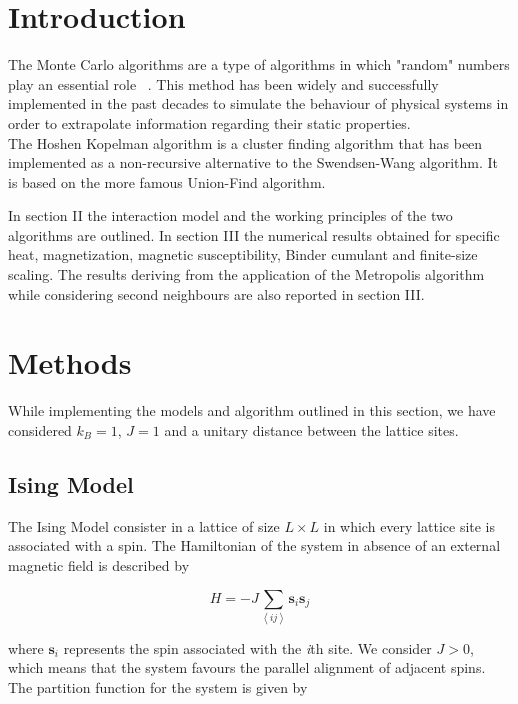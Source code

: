 \documentclass[twoside]{article}
\def\mean#1{\left< #1 \right>}
\begin{document}
\begin{multicols}{2} %

\section{Introduction}
The Monte Carlo algorithms are a type of algorithms in which "random" numbers play an essential role ~\cite{thijssen}. This method has been widely and successfully implemented in the past decades to simulate the behaviour of physical systems in order to extrapolate information regarding their static properties. \\
The Hoshen Kopelman algorithm is a cluster finding algorithm that has been implemented as a non-recursive alternative to the Swendsen-Wang algorithm. It is based on the more famous Union-Find algorithm.

In section II the interaction model and the working principles of the two algorithms are outlined. In section III the numerical results obtained for specific heat, magnetization, magnetic susceptibility, Binder cumulant and finite-size scaling. The results deriving from the application of the Metropolis algorithm while considering second neighbours are also reported in section III.


\section{Methods}
While implementing the models and algorithm outlined in this section, we have considered $k_B = 1$, $J = 1$ and a unitary distance between the lattice sites.

\subsection{Ising Model}
The Ising Model consister in a lattice of size $L \times L$ in which every lattice site is associated with a spin. The Hamiltonian of the system in absence of an external magnetic field is described by

\begin{equation}
\label{ising_hamiltonian}
H = - J \sum_{\mean{ij}} \textbf{s}_i \textbf{s}_j
\end{equation}

where $\textbf{s}_i$ represents the spin associated with the \emph{i}th site.
We consider $J > 0$, which means that the system favours the parallel alignment of adjacent spins.
The partition function for the system is given by 


\end{multicols}
\end{document}
